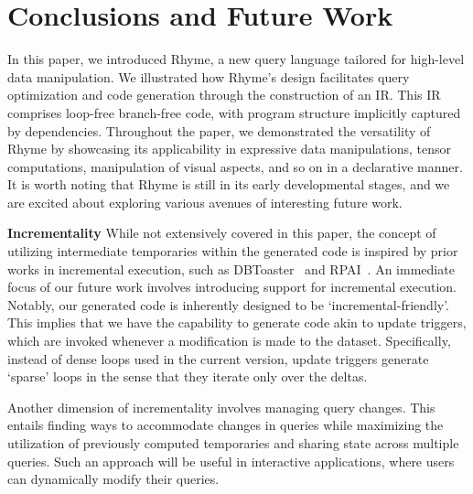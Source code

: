 \documentclass[runningheads]{llncs}
\newcommand{\lang}{Rhyme}
\begin{document}



\vspace{-5mm}
\section{Conclusions and Future Work}\label{sec:conclusions}
\vspace{-3mm}
In this paper, we introduced \lang{}, a new query language tailored for high-level
data manipulation.
We illustrated how \lang{}'s design facilitates query optimization and code generation
through the construction of an IR.
This IR comprises loop-free branch-free code, with program structure implicitly captured
by dependencies.
Throughout the paper, we demonstrated the versatility of \lang{} by showcasing its
applicability in expressive data manipulations,
tensor computations, manipulation of visual aspects, and so on in a declarative manner.
It is worth noting that \lang{} is still in its early developmental stages,
and we are excited about exploring various avenues of interesting future work.

\textbf{Incrementality}
While not extensively covered in this paper, the concept of utilizing
intermediate temporaries within the generated code is inspired by prior
works in incremental execution, such as DBToaster~\cite{dbtoaster_vldb}
and RPAI~\cite{rpai}.
An immediate focus of our future work involves introducing support for
incremental execution.
Notably, our generated code is inherently designed to be `incremental-friendly'.
This implies that we have the capability to generate code akin to update
triggers, which are invoked whenever a modification is made to the dataset.
Specifically, instead of dense loops used in the current version, update triggers
generate `sparse' loops in the sense that they iterate only over the deltas.

Another dimension of incrementality involves managing query changes.
This entails finding ways to accommodate changes in queries while maximizing
the utilization of previously computed temporaries and sharing state across
multiple queries. 
Such an approach will be useful in interactive applications, where users
can dynamically modify their queries.
\end{document}
